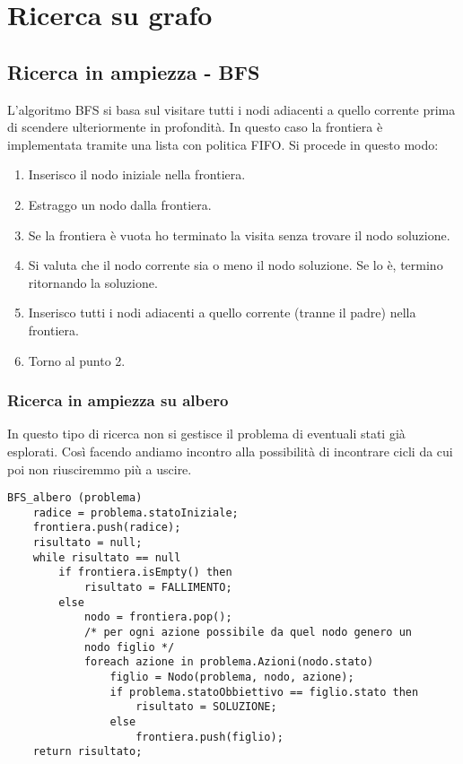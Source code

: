 \section{Ricerca su grafo}
\subsection{Ricerca in ampiezza - BFS}
L'algoritmo BFS si basa sul visitare tutti i nodi adiacenti a quello corrente prima di
scendere ulteriormente in profondit\`a. In questo caso la frontiera \`e implementata
tramite una lista con politica FIFO. Si procede in questo modo:
\begin{enumerate}
	\item Inserisco il nodo iniziale nella frontiera.
	\item Estraggo un nodo dalla frontiera.
	\item Se la frontiera \`e vuota ho terminato la visita senza trovare il nodo soluzione.
	\item Si valuta che il nodo corrente sia o meno il nodo soluzione. Se lo \`e, termino
	      ritornando la soluzione.
	\item Inserisco tutti i nodi adiacenti a quello corrente (tranne il padre) nella
	      frontiera.
	\item Torno al punto 2.
\end{enumerate}

\subsubsection{Ricerca in ampiezza su albero}
In questo tipo di ricerca non si gestisce il problema di eventuali stati gi\`a esplorati.
Cos\`i facendo andiamo incontro alla possibilit\`a di incontrare cicli da cui poi non
riusciremmo pi\`u a uscire.
\begin{lstlisting}[style=pseudo-style]
BFS_albero (problema)
	radice = problema.statoIniziale;
	frontiera.push(radice);
	risultato = null;
	while risultato == null
		if frontiera.isEmpty() then
			risultato = FALLIMENTO;
		else
			nodo = frontiera.pop();
			/* per ogni azione possibile da quel nodo genero un 
			nodo figlio */
			foreach azione in problema.Azioni(nodo.stato)
				figlio = Nodo(problema, nodo, azione);
				if problema.statoObbiettivo == figlio.stato then
					risultato = SOLUZIONE;
				else
					frontiera.push(figlio);
	return risultato;
\end{lstlisting}

